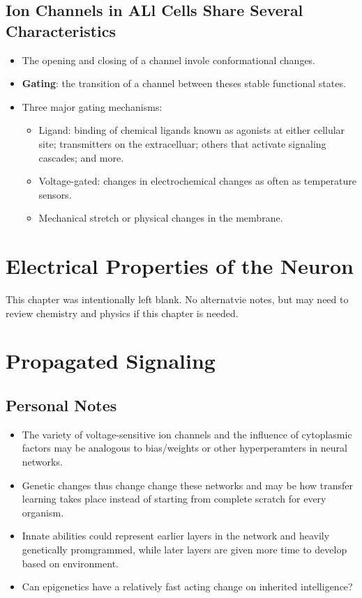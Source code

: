 \documentclass[12pt,a4paper]{article}
\begin{document}
\subsection{Ion Channels in ALl Cells Share Several Characteristics}
\begin{itemize}
    \item The opening and closing of a channel invole conformational changes.
    \item \textbf{Gating}: the transition of a channel between theses stable functional states.
    \item Three major gating mechanisms:
        \begin{itemize}
            \item Ligand: binding of chemical ligands known as agonists at either cellular site; transmitters on the extracelluar; others that activate signaling cascades; and more. 
            \item Voltage-gated: changes in electrochemical changes as often as temperature sensors.
            \item Mechanical stretch or physical changes in the membrane.
        \end{itemize}
\end{itemize}

\clearpage
\section{Electrical Properties of the Neuron}
    This chapter was intentionally left blank. No alternatvie notes, but may need to review chemistry and physics if this chapter is needed.

\clearpage
\section{Propagated Signaling}
\subsection{Personal Notes}
\begin{itemize}
    \item The variety of voltage-sensitive ion channels and the influence of cytoplasmic factors may be analogous to bias/weights or other hyperperamters in neural networks.
    \item Genetic changes thus change change these networks and may be how transfer learning takes place instead of starting from complete scratch for every organism. 
    \item Innate abilities could represent earlier layers in the network and heavily genetically promgrammed, while later layers are given more time to develop based on environment. 
    \item Can epigenetics have a relatively fast acting change on inherited intelligence? 
\end{itemize}
\end{document}
